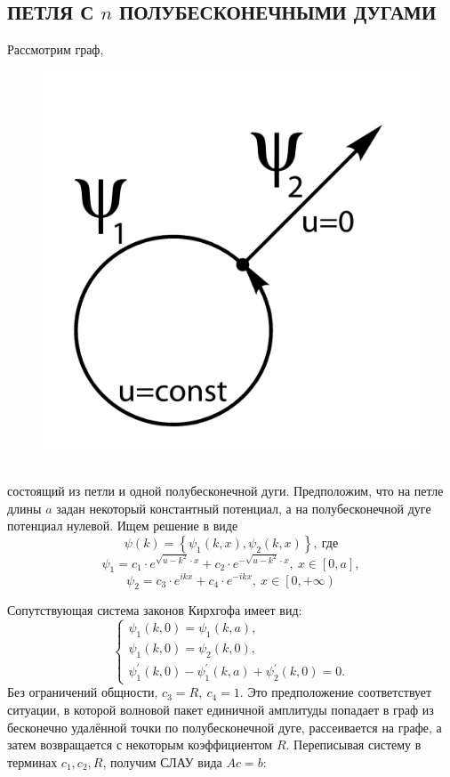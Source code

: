 \documentclass[a4 paper, 12 pt]{extarticle}
\begin{document}
   \subsection{ПЕТЛЯ С $n$ ПОЛУБЕСКОНЕЧНЫМИ ДУГАМИ}
   Рассмотрим граф,
   \begin{figure}[!htb]
   	\centering
   	\includegraphics[scale=0.5]{one-arrow.jpg}
   \end{figure}
   \\состоящий из петли и одной полубесконечной дуги. Предположим, что на петле длины $a$ задан некоторый константный потенциал, а на полубесконечной дуге потенциал нулевой.
   Ищем решение в виде
   \[\psi\left(k\right) = \left\{\psi_1\left(k,x\right), \psi_2\left(k,x\right)\right\}, \ \text{где}\]
   \[
   \psi_1 = c_1\cdot e^{\sqrt{u-k^2} \cdot x} + c_2\cdot e^{-\sqrt{u-k^2} \cdot x}, \ x \in \left[0,a\right],\]
   \[\psi_2 = c_3 \cdot e^{ikx}+c_4 \cdot e^{-ikx}, \ x \in \left[0,+\infty\right)\]
   
   Сопутствующая система законов Кирхгофа имеет вид:
   \[\begin{cases}
   \psi_1\left(k,0\right)=\psi_1\left(k,a\right), \\
   \psi_{1}\left(k,0\right)=\psi_2\left(k,0\right), \\
   \psi_1^\prime\left(k,0\right)-\psi_1^\prime\left(k,a\right)+\psi_2^\prime\left(k,0\right)=0.
   \end{cases}
   \]
   Без ограничений общности, $c_3=R, \ c_4 = 1$. Это предположение соответствует ситуации, в которой волновой пакет единичной амплитуды попадает в граф из бесконечно удалённой точки по полубесконечной дуге, рассеивается на графе, а затем возвращается с некоторым коэффициентом $R$. Переписывая систему в терминах $c_1,c_2,R$, получим СЛАУ вида $Ac=b$:
   
\end{document}
